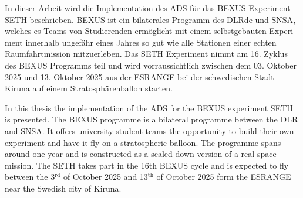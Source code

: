 \begin{otherlanguage}{ngerman}
In dieser Arbeit wird die Implementation des \acf{ADS} für das \acs{BEXUS}-Experiment \ac{SETH} beschrieben. \acf{BEXUS} ist ein bilaterales Programm des \acf{DLRde} und \acf{SNSA}, welches es Teams von Studierenden ermöglicht mit einem selbstgebauten Experiment innerhalb ungefähr eines Jahres so gut wie alle Stationen einer echten Raumfahrtmission mitzuerleben. Das \ac{SETH} Experiment nimmt am 16. Zyklus des \ac{BEXUS} Programms teil und wird vorraussichtlich zwischen dem 03. Oktober 2025 und 13. Oktober 2025 aus der \ac{ESRANGE} bei der schwedischen Stadt Kiruna auf einem Stratosphärenballon starten.
\end{otherlanguage}

In this thesis the implementation of the \acf{ADS} for the \acf{BEXUS} experiment \acf{SETH} is presented. The \acf{BEXUS} programme is a bilateral programme between the \acf{DLR} and \acf{SNSA}. It offers university student teams the opportunity to build their own experiment and have it fly on a stratospheric balloon. The programme spans around one year and is constructed as a scaled-down version of a real space mission. The \acf{SETH} takes part in the 16th \ac{BEXUS} cycle and is expected to fly between the 3$^\mathrm{rd}$ of October 2025 and 13$^\mathrm{th}$ of October 2025 form the \acf{ESRANGE} near the Swedish city of Kiruna.